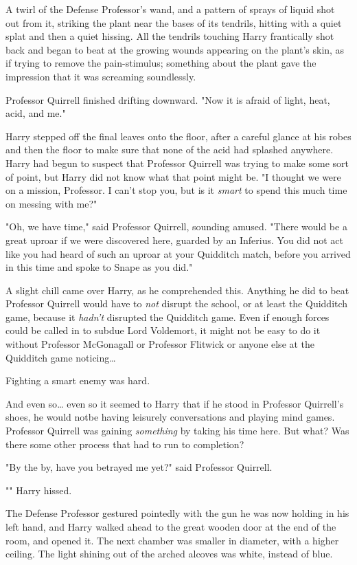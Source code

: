 A twirl of the Defense Professor's wand, and a pattern of sprays of liquid shot
out from it, striking the plant near the bases of its tendrils, hitting with a
quiet splat and then a quiet hissing. All the tendrils touching Harry
frantically shot back and began to beat at the growing wounds appearing on the
plant's skin, as if trying to remove the pain-stimulus; something about the
plant gave the impression that it was screaming soundlessly.

Professor Quirrell finished drifting downward. "Now it is afraid of light,
heat, acid, and me."

Harry stepped off the final leaves onto the floor, after a careful glance at
his robes and then the floor to make sure that none of the acid had splashed
anywhere. Harry had begun to suspect that Professor Quirrell was trying to make
some sort of point, but Harry did not know what that point might be. "I thought
we were on a mission, Professor. I can't stop you, but is it \emph{smart} to
spend this much time on messing with me?"

"Oh, we have time," said Professor Quirrell, sounding amused. "There would be a
great uproar if we were discovered here, guarded by an Inferius. You did not
act like you had heard of such an uproar at your Quidditch match, before you
arrived in this time and spoke to Snape as you did."

A slight chill came over Harry, as he comprehended this. Anything he did to
beat Professor Quirrell would have to \emph{not} disrupt the school, or at
least the Quidditch game, because it \emph{hadn't} disrupted the Quidditch
game. Even if enough forces could be called in to subdue Lord Voldemort, it
might not be easy to do it without Professor McGonagall or Professor Flitwick
or anyone else at the Quidditch game noticing{\ldots}

Fighting a smart enemy was hard.

And even so{\ldots} even so it seemed to Harry that if he stood in Professor
Quirrell's shoes, he would notbe having leisurely conversations and playing
mind games. Professor Quirrell was gaining \emph{something} by taking his time
here. But what? Was there some other process that had to run to completion?

"By the by, have you betrayed me yet?" said Professor Quirrell.

"" Harry hissed.

The Defense Professor gestured pointedly with the gun he was now holding in his
left hand, and Harry walked ahead to the great wooden door at the end of the
room, and opened it.
\later
The next chamber was smaller in diameter, with a higher ceiling. The light
shining out of the arched alcoves was white, instead of blue.

